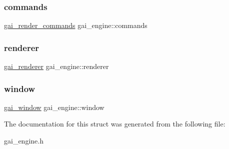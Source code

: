 \subsubsection{\texorpdfstring{commands}{commands}}
{\footnotesize\ttfamily \hyperlink{structgai__render__commands}{gai\+\_\+render\+\_\+commands} gai\+\_\+engine\+::commands}

\mbox{\label{structgai__engine_adbeafcc6f92b0c4872671ceab7c78eb4}} 
\subsubsection{\texorpdfstring{renderer}{renderer}}
{\footnotesize\ttfamily \hyperlink{uniongai__renderer}{gai\+\_\+renderer} gai\+\_\+engine\+::renderer}

\mbox{\label{structgai__engine_a7460be72bda39ea674c38d1e45eed5ac}} 
\subsubsection{\texorpdfstring{window}{window}}
{\footnotesize\ttfamily \hyperlink{structgai__window}{gai\+\_\+window} gai\+\_\+engine\+::window}



The documentation for this struct was generated from the following file\+:\begin{DoxyCompactItemize}
\item 
gai\+\_\+engine.\+h\end{DoxyCompactItemize}
